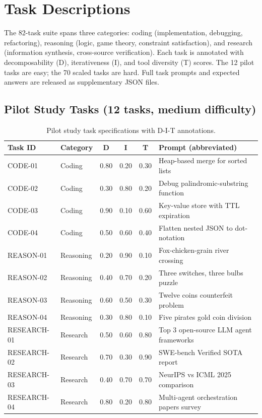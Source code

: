 \section{Task Descriptions}\label{app:task-descriptions}

The 82-task suite spans three categories: coding (implementation, debugging, refactoring), reasoning (logic, game theory, constraint satisfaction), and research (information synthesis, cross-source verification). Each task is annotated with decomposability (D), iterativeness (I), and tool diversity (T) scores. The 12 pilot tasks are easy; the 70 scaled tasks are hard. Full task prompts and expected answers are released as supplementary JSON files.

\subsection{Pilot Study Tasks (12 tasks, medium difficulty)}\label{app:pilot-tasks}

\begin{table}[ht]
\centering
\caption{Pilot study task specifications with D-I-T annotations.}
\label{tab:pilot_tasks}
\small
\begin{tabular}{llcccl}
\toprule
Task ID & Category & D & I & T & Prompt (abbreviated) \\
\midrule
CODE-01 & Coding & 0.80 & 0.20 & 0.30 & Heap-based merge for sorted lists \\
CODE-02 & Coding & 0.30 & 0.80 & 0.20 & Debug palindromic-substring function \\
CODE-03 & Coding & 0.90 & 0.10 & 0.60 & Key-value store with TTL expiration \\
CODE-04 & Coding & 0.50 & 0.60 & 0.40 & Flatten nested JSON to dot-notation \\
REASON-01 & Reasoning & 0.20 & 0.90 & 0.10 & Fox-chicken-grain river crossing \\
REASON-02 & Reasoning & 0.40 & 0.70 & 0.20 & Three switches, three bulbs puzzle \\
REASON-03 & Reasoning & 0.60 & 0.50 & 0.30 & Twelve coins counterfeit problem \\
REASON-04 & Reasoning & 0.30 & 0.80 & 0.10 & Five pirates gold coin division \\
RESEARCH-01 & Research & 0.50 & 0.60 & 0.80 & Top 3 open-source LLM agent frameworks \\
RESEARCH-02 & Research & 0.70 & 0.30 & 0.90 & SWE-bench Verified SOTA report \\
RESEARCH-03 & Research & 0.40 & 0.70 & 0.70 & NeurIPS vs ICML 2025 comparison \\
RESEARCH-04 & Research & 0.80 & 0.20 & 0.80 & Multi-agent orchestration papers survey \\
\bottomrule
\end{tabular}
\end{table}

